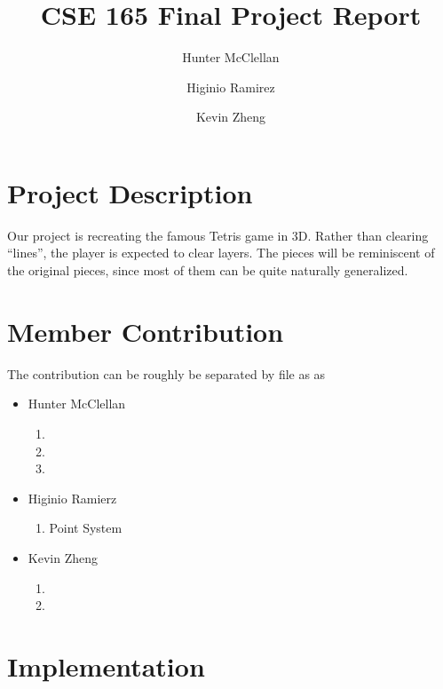 \documentclass[letterpaper, 12pt]{article}
\title{CSE 165 Final Project Report}
\author{Hunter McClellan \and Higinio Ramirez \and Kevin Zheng}
\begin{document}
\maketitle
\section{Project Description}
Our project is recreating the famous Tetris game in 3D.
Rather than clearing ``lines'', the player is expected to clear layers.
The pieces will be reminiscent of the original pieces, since most of them can be quite naturally generalized.
\section{Member Contribution}
The contribution can be roughly be separated by file as as
\begin{itemize}
    \item Hunter McClellan
        \begin{enumerate}
            \item {}
            \item {}
            \item {}
        \end{enumerate}
    \item Higinio Ramierz
        \begin{enumerate}
            \item Point System
        \end{enumerate}
    \item Kevin Zheng
        \begin{enumerate}
            \item {}
            \item {}
        \end{enumerate}
\end{itemize}
\section{Implementation}
\end{document}
